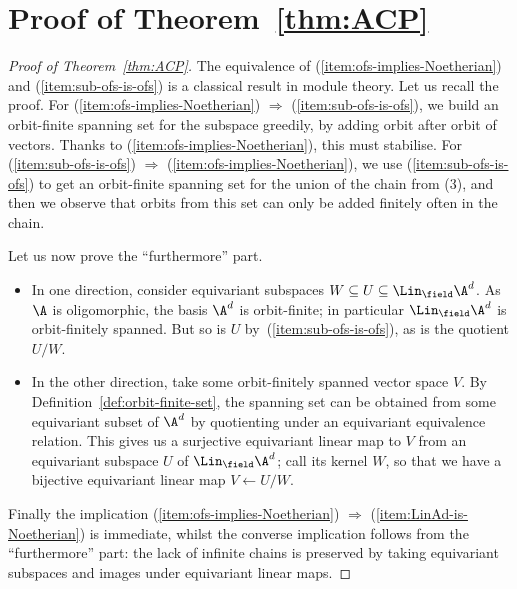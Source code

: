 \section{Proof of Theorem~\ref{thm:ACP}}\label{sec:appendix-modules}
\begin{proof}[Proof of Theorem~\ref{thm:ACP}]
    The equivalence of (\ref{item:ofs-implies-Noetherian}) and (\ref{item:sub-ofs-is-ofs}) is a classical result in module theory. 
    Let us recall the proof. 
    For (\ref{item:ofs-implies-Noetherian}) $\Rightarrow$ (\ref{item:sub-ofs-is-ofs}), we build an orbit-finite spanning set for the subspace greedily, by adding orbit after orbit of vectors. 
    Thanks to (\ref{item:ofs-implies-Noetherian}), this must stabilise. 
    For (\ref{item:sub-ofs-is-ofs}) $\Rightarrow$ (\ref{item:ofs-implies-Noetherian}), we use (\ref{item:sub-ofs-is-ofs}) to get an orbit-finite spanning set for the union of the chain from (3), 
    and then we observe that orbits from this set can only be added finitely often in the chain. 

    Let us now prove the ``furthermore'' part. 
    \begin{itemize}
        \item 
        In one direction, consider equivariant subspaces $W \subseteq U \subseteq \Lin_\field \A^d$.
        As $\A$ is oligomorphic, the basis $\A^d$ is orbit-finite; 
        in particular $\Lin_\field \A^d$ is orbit-finitely spanned.
        But so is $U$ by~(\ref{item:sub-ofs-is-ofs}), as is the quotient $U/W$. 
        \item 
        In the other direction, take some orbit-finitely spanned vector space $V$. 
        By Definition~\ref{def:orbit-finite-set}, the spanning set can be obtained from some equivariant subset of $\A^d$ by quotienting under an equivariant equivalence relation. 
        This gives us a surjective equivariant linear map to $V$ from an equivariant subspace $U$ of $\Lin_\field \A^d$; 
        call its kernel $W$, so that we have a bijective equivariant linear map $V \leftarrow U/W$. 
    \end{itemize}

    Finally the implication (\ref{item:ofs-implies-Noetherian}) $\Rightarrow$ (\ref{item:LinAd-is-Noetherian}) is immediate, 
    whilst the converse implication follows from the ``furthermore'' part: 
    the lack of infinite chains is preserved by taking equivariant subspaces and images under equivariant linear maps. 
\end{proof}
